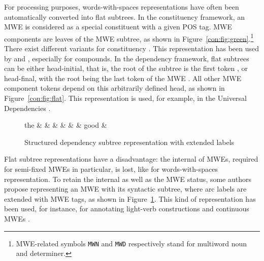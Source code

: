 \documentclass[output=paper]{langsci/langscibook}
\begin{document}
For processing purposes, words-with-spaces representations have often been automatically converted into flat subtrees. In the constituency framework, an MWE is considered as a special constituent with a given POS tag. MWE components are leaves of the MWE subtree, as shown in Figure~\ref{con:fig:green}.\footnote{MWE-related symbols \texttt{MWN} and \texttt{MWD} respectively stand for multiword noun and determiner.} There exist different variants for constituency  \citep{gowiska:2010}. This representation has been used by \citet{arun05} and \citet{green11}, especially for compounds. 
In the dependency framework, flat subtrees can be either head-initial, that is, the root of the subtree is the first token \citep{nivre04,seddah13}, or head-final, with the root being the last token of the MWE \citep{eryigit:2011:multiword}. All other MWE component tokens depend on this arbitrarily defined head, as shown in Figure~\ref{con:fig:flat}. This representation is used, for example, in the Universal Dependencies  \citep{nivre16}.

\begin{figure}[t]
\small
\begin{center}
\begin{dependency}[edge unit distance=2ex]
\begin{deptext}[column sep=.7cm]
the \& \color{red}{prime} \& \color{red}{minister} \& \color{blue}{made} \& \color{orange}{a} \& \color{orange}{few} \& good \& \color{blue}{decisions} \\
\end{deptext}
\end{dependency}
\vspace{-0.3cm}
\caption{Structured dependency subtree representation with extended labels}
\label{con:fig:extended-labels}
\end{center}
\end{figure}



Flat subtree representations have a disadvantage: the internal  of MWEs, required for semi-fixed MWEs in particular, is lost, like for words-with-spaces representation. To retain the internal  as well as the MWE status, some authors propose representing an MWE with its syntactic subtree, where arc labels are extended with MWE tags, as shown in Figure~\ref{con:fig:extended-labels}. This kind of representation has been used, for instance, for annotating light-verb constructions \citep{vincze13} and continuous MWEs \citep{candito2014strategies}. 
\end{document}
